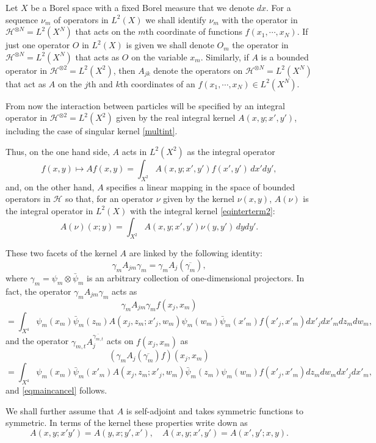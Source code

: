 \documentclass[12pt]{article}
\def\HC{\mathcal{H}}
\def\ga{\gamma}
\begin{document}
Let $X$ be a Borel space with a fixed Borel measure that we denote $dx$.
For a sequence $\nu_m$ of operators in $L^2(X)$ we shall identify $\nu_m$
with the operator in $\HC^{\otimes N}=L^2(X^N)$
that acts on the $m$th coordinate of functions $f(x_1, \cdots, x_N)$.
If just one operator $O$ in $L^2(X)$ is given we shall denote $O_m$
the operator in $\HC^{\otimes N}=L^2(X^N)$ that acts as $O$ on the variable $x_m$.
Similarly, if $A$ is a bounded operator in $\HC^{\otimes 2}=L^2(X^2)$, then
$A_{jk}$ denote the operators on $\HC^{\otimes N}=L^2(X^N)$ that act as $A$ on
 the $j$th and $k$th coordinates of an $f(x_1, \cdots, x_N)\in L^2(X^N)$.

From now the interaction between particles will be specified by an integral operator
in $\HC^{\otimes 2}=L^2(X^2)$ given by the real integral kernel
$A(x,y;x',y')$, including the case of singular kernel \eqref{multint}.

Thus, on the one hand side,  $A$ acts in $L^2(X^2)$ as the integral operator
\begin{equation}
\label{intopL2}
f(x,y) \mapsto Af(x,y)=\int_{X^2} A(x,y;x',y')f (x',y') \, dx'dy',
\end{equation}
and, on the other hand, $A$ specifies a linear mapping in the space of bounded operators in $\HC$
so that, for an operator $\nu$ given by the kernel $\nu(x,y)$,
$A(\nu)$ is the integral operator in $L^2(X)$ with the integral kernel \eqref{eqinterterm2}:
\[
A(\nu)(x;y)=\int_{X^2} A(x,y;x',y')\nu (y,y') \, dydy'.
\]

These two facets of the kernel $A$ are linked by the following identity:
\begin{equation}
\label{eqmaincancel}
\ga_m A_{jm}\ga_m =\ga_m A_j(\overline{\ga_m}),
\end{equation}
where $\ga_m=\psi_m\otimes \bar \psi_m$ is an arbitrary collection of one-dimensional projectors.
In fact, the operator $\ga_m A_{jm}\ga_m$ acts as
\[
\ga_m A_{jm}\ga_m f(x_j,x_m)
\]
\[
=\int_{X^4} \psi_m (x_m)\bar \psi_m (z_m) A(x_j,z_m; x'_j,w_m)\psi_m(w_m)\bar \psi_m (x'_m)
f(x'_j,x'_m) dx'_jdx'_m dz_m dw_m,
\]
and the operator $\ga_{m,t}A_j^{\overline{\ga_{m,t}}}$ acts on $f(x_j,x_m)$ as
\[
(\ga_mA_j(\overline{\ga_m}) f)(x_j,x_m)
\]
\[
= \int_{X^4} \psi_m(x_m) \bar \psi_m(x'_m) A(x_j,z_m;x'_j,w_m)
\bar \psi_m(z_m) \psi_m(w_m) f(x'_j,x'_m) dz_m dw_m dx'_j dx'_m,
\]
and \eqref{eqmaincancel} follows.

We shall further assume that $A$
is self-adjoint and takes symmetric functions to symmetric. In terms of the kernel
these properties write down as
\begin{equation}
\label{eq1athmynonlinSch}
A(x,y;x'y')=A(y,x;y',x'), \quad A(x,y;x',y')=A(x',y';x,y).
\end{equation}
\end{document}
